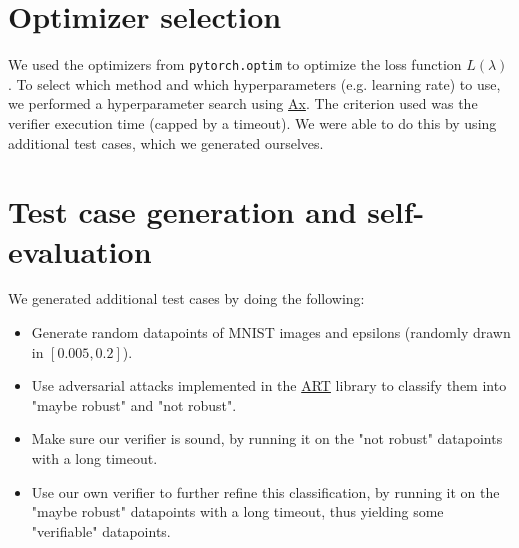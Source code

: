 \documentclass{article}
\begin{document}
\section{Optimizer selection}

We used the optimizers from \texttt{pytorch.optim} to optimize the loss function $L(\lambda)$. 
To select which method and which hyperparameters (e.g. learning rate) to use, we performed a hyperparameter search using \href{https://github.com/facebook/Ax}{Ax}.
The criterion used was the verifier execution time (capped by a timeout).
We were able to do this by using additional test cases, which we generated ourselves.

\section{Test case generation and self-evaluation}

We generated additional test cases by doing the following:
\begin{itemize}[noitemsep]
    \item Generate random datapoints of MNIST images and epsilons (randomly drawn in $[0.005, 0.2]$).
    \item Use adversarial attacks implemented in the \href{https://github.com/IBM/adversarial-robustness-toolbox/}{ART} library to classify them into "maybe robust" and "not robust".
    \item Make sure our verifier is sound, by running it on the "not robust" datapoints with a long timeout.
    \item Use our own verifier to further refine this classification, by running it on the "maybe robust" datapoints with a long timeout, thus yielding some "verifiable" datapoints.
\end{itemize}
\end{document}
